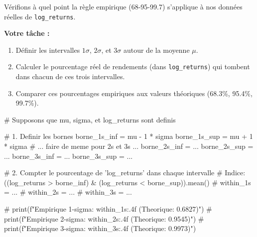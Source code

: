 \begin{exercicebox}
Vérifions à quel point la règle empirique (68-95-99.7) s'applique à nos données réelles de \texttt{log\_returns}.

\textbf{Votre tâche :}
\begin{enumerate}
    \item Définir les intervalles $1\sigma$, $2\sigma$, et $3\sigma$ autour de la moyenne $\mu$.
    \item Calculer le pourcentage réel de rendements (dans \texttt{log\_returns}) qui tombent dans chacun de ces trois intervalles.
    \item Comparer ces pourcentages empiriques aux valeurs théoriques (68.3\%, 95.4\%, 99.7\%).
\end{enumerate}

\begin{codecell}
# Supposons que mu, sigma, et log_returns sont definis

# 1. Definir les bornes
borne_1s_inf = mu - 1 * sigma
borne_1s_sup = mu + 1 * sigma
# ... faire de meme pour 2s et 3s ...
borne_2s_inf = ...
borne_2s_sup = ...
borne_3s_inf = ...
borne_3s_sup = ...

# 2. Compter le pourcentage de 'log_returns' dans chaque intervalle
# Indice: ((log_returns > borne_inf) & (log_returns < borne_sup)).mean()
# within_1s = ...
# within_2s = ...
# within_3s = ...

# print(f"Empirique 1-sigma: {within_1s:.4f} (Theorique: 0.6827)")
# print(f"Empirique 2-sigma: {within_2s:.4f} (Theorique: 0.9545)")
# print(f"Empirique 3-sigma: {within_3s:.4f} (Theorique: 0.9973)")
\end{codecell}
\end{exercicebox}

